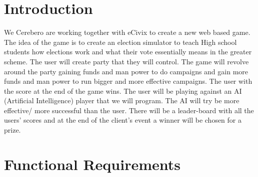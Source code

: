 \documentclass{article}
\begin{document}
  
  

  \tableofcontents
  \newpage

 \section{Introduction}
	We Cerebero are working together with eCivix to create a new web based game. The idea of the game is to create an election simulator to teach High school students how elections work and what their vote essentially means in the greater scheme. The user will create party that they will control. The game will revolve around the party gaining funds and man power to do campaigns and gain more funds and man power to run bigger and more effective campaigns. The user with the score at the end of the game wins. The user will be playing against an AI (Artificial Intelligence) player that we will program. The AI will try be more effective/ more successful than the user. There will be a leader-board with all the users' scores and at the end of the client's event a winner will be chosen for a prize. 
	


  \section{Functional Requirements}
\end{document}
